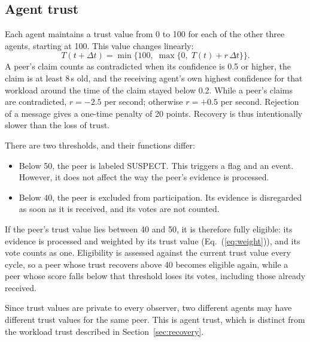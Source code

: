 \documentclass[journal]{IEEEtran}
\begin{document}
\subsection{Agent trust}
Each agent maintains a trust value from 0 to 100 for each of the other three agents, starting at 100. This value changes linearly:
\begin{equation}
T(t+\Delta t)=\min\{100,\;\max\{0,\;T(t)+r\,\Delta t\}\}.
\label{eq:trust}
\end{equation}
A peer's claim counts as contradicted when its confidence is 0.5 or higher, the claim is at least 8\,s old, and the receiving agent's own highest confidence for that workload around the time of the claim stayed below 0.2. While a peer's claims are contradicted, $r=-2.5$ per second; otherwise $r=+0.5$ per second. Rejection of a message gives a one-time penalty of 20 points. Recovery is thus intentionally slower than the loss of trust.

There are two thresholds, and their functions differ:
\begin{itemize}
\item Below 50, the peer is labeled SUSPECT. This triggers a flag and an event. However, it does not affect the way the peer's evidence is processed.
\item Below 40, the peer is excluded from participation. Its evidence is disregarded as soon as it is received, and its votes are not counted.
\end{itemize}
If the peer's trust value lies between 40 and 50, it is therefore fully eligible: its evidence is processed and weighted by its trust value (Eq.~(\ref{eq:weight})), and its vote counts as one. Eligibility is assessed against the current trust value every cycle, so a peer whose trust recovers above 40 becomes eligible again, while a peer whose score falls below that threshold loses its votes, including those already received.

Since trust values are private to every observer, two different agents may have different trust values for the same peer. This is agent trust, which is distinct from the workload trust described in Section~\ref{sec:recovery}.
\end{document}

